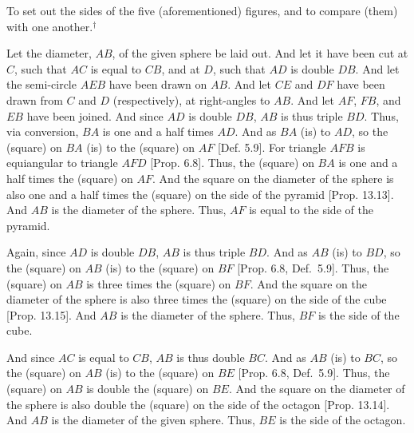 \begin{Parallel}{}{}
{To set out the sides of the five (aforementioned) figures, and to compare (them)
with one another.$^\dag$

\epsfysize=2.25in
\centerline{}

Let the diameter, $AB$, of the given sphere be laid out. And let it
have been cut at $C$, such that $AC$ is equal to $CB$, and at $D$, such
that $AD$ is double $DB$. And let the semi-circle $AEB$ have been
drawn on $AB$. And let $CE$ and $DF$ have been drawn from $C$
and $D$ (respectively), at right-angles to $AB$. And let $AF$, $FB$,
and $EB$ have been joined. And since $AD$ is double $DB$, 
$AB$ is thus triple $BD$. Thus, via conversion, $BA$ is one and
a half times $AD$. And as $BA$ (is) to $AD$, so the (square)
on $BA$ (is) to the (square) on $AF$ [Def. 5.9].  For
triangle $AFB$ is equiangular to triangle $AFD$ [Prop. 6.8]. 
Thus, the (square) on $BA$ is one and a half times the (square)
on $AF$. And the square on the diameter of the sphere
is also one and a half times the (square) on the side of the pyramid
[Prop. 13.13].  And $AB$ is the diameter of the sphere. Thus,
$AF$ is equal to the side of the pyramid.

Again, since $AD$ is double $DB$,  $AB$ is thus triple $BD$. And
as $AB$ (is) to $BD$, so the (square) on $AB$ (is) to the (square)
on $BF$ [Prop. 6.8, Def.~5.9]. Thus, the (square) on $AB$
is three times the (square) on $BF$.  And the square on the diameter of
the sphere is also three times the (square) on the side of the cube [Prop. 13.15]. And $AB$ is the diameter of the sphere. Thus, $BF$ is the
side of the cube.

And since $AC$ is equal to $CB$, $AB$ is thus double $BC$.  And
as $AB$ (is) to $BC$, so the (square) on $AB$ (is) to the (square)
on $BE$ [Prop. 6.8, Def.~5.9]. Thus, the (square) on $AB$
is double the (square) on $BE$. And the square on the diameter
of the sphere is also double the (square) on the side of the octagon [Prop. 13.14]. And $AB$ is the diameter of the given sphere. Thus,
$BE$ is the side of the octagon.

}
\end{Parallel}
